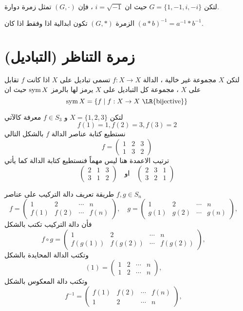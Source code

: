 \begin{example}
	لتكن $G=\{1,-1,i,-i\}$ حيث ان $i = \sqrt{-1}$ ، فإن $(G, \cdot)$ تمثل زمرة دوارة.
\end{example}

\begin{theorem}
	الزمرة $(G, *)$ تكون ابدالية اذا وفقط اذا كان $(a*b)^{-1} = a^{-1} * b^{-1}$.
\end{theorem}

\section{زمرة التناظر (التباديل)}

\begin{definition}
	لتكن $X$ مجموعة غير خالية ، الدالة $f:X\to X$ تسمى تباديل على $X$ اذا كانت $f$ تقابل على $X$ ، مجموعة كل التباديل على $X$ يرمز لها بالرمز $\operatorname{sym}{X}$ حيث ان 
	\[
	\sym{X} = \{ f\mid f:X\to X \,\,\text{\LR{bijective}}\}
	\]
\end{definition}

\begin{example}
	لتكن $X=\{1,2,3\}$ و $f \in S_3$ معرفة كالآتي
	\[
	f(1)=1, f(2)=3, f(3)=2
	\]
	نستطيع كتابة عناصر الدالة $f$ بالشكل التالي
	\[
	f = \begin{pmatrix}
		1&2&3\\
		1&3&2
	\end{pmatrix}
	\]
	ترتيب الاعمدة هنا ليس مهماً فنستطيع كتابة الدالة كما يأتي
	\[
	\begin{pmatrix}
		2&1&3\\
		3&1&2
	\end{pmatrix} \quad \text{او} \quad 
	\begin{pmatrix}
		2&3&1\\
		3&2&1
	\end{pmatrix}
	\]
\end{example}

\begin{note}
	طريقة تعريف دالة التركيب على عناصر $f, g\in S_n$ 
	\[
	f = \begin{pmatrix}
		1&2&\cdots&n\\
		f(1)&f(2)&\cdots&f(n)
	\end{pmatrix}, \quad 
	g = \begin{pmatrix}
	1&2&\cdots&n\\
	g(1)&g(2)&\cdots&g(n)
\end{pmatrix}, \quad 
	\]
	فأن دالة التركيب تكتب بالشكل
	\[
		f\circ g = \begin{pmatrix}
		1&2&\cdots&n\\
		f(g(1))&f(g(2))&\cdots&f(g(2))
	\end{pmatrix}, \quad 
	\]
	وتكتب الدالة المحايدة بالشكل
	\[
		(1)= \begin{pmatrix}
		1&2&\cdots&n\\
		1&2&\cdots&n
	\end{pmatrix}, \quad 
	\]
	وتكتب دالة المعكوس بالشكل
	\[
	f^{-1}=
		 \begin{pmatrix}
		f(1)&f(2)&\cdots&f(n)\\
				1&2&\cdots&n
	\end{pmatrix}, \quad 
	\]
\end{note}

